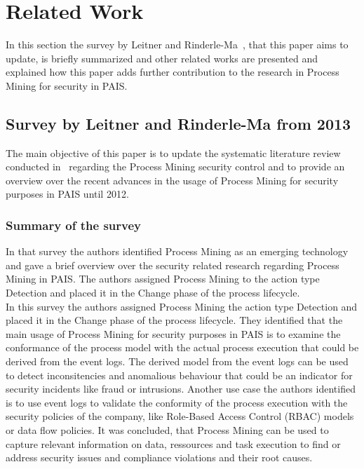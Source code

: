 \documentclass[runningheads]{llncs}
\begin{document}
\section{Related Work}\label{Related}
In this section the survey by Leitner and Rinderle-Ma~\cite{Leitner2014273}, that this paper aims to update, is briefly summarized and other related works are presented and explained how
this paper adds further contribution to the research in Process Mining for security in PAIS.\\
\subsection{Survey by Leitner and Rinderle-Ma from 2013}\label{basepaper}
The main objective of this paper is to update the systematic literature review conducted in~\cite{Leitner2014273} regarding the Process Mining security control and to provide an overview over the recent advances
in the usage of Process Mining for security purposes in PAIS until 2012. 
\subsubsection{Summary of the survey}\label{Summary}
In that survey the authors identified Process Mining as an emerging technology and gave a brief overview
over the security related research regarding Process Mining in PAIS\@. The authors assigned Process Mining to the action type Detection and placed it in the Change phase of the
process lifecycle.\\
In this survey the authors assigned Process Mining the action type Detection and placed it in the Change phase of the process lifecycle. They identified that the main usage of 
Process Mining for security purposes in PAIS is to examine the conformance of the process model with the actual process execution that could be derived from the event logs.
The derived model from the event logs can be used to detect inconsitencies and anomalious behaviour that could be an indicator for security incidents like fraud or intrusions.
Another use case the authors identified is to use event logs to validate the conformity of the process execution with the security policies of the company, like 
Role-Based Access Control (RBAC) models or data flow
policies. It was concluded, that Process Mining can be used to capture relevant information on data, ressources and task execution to find or address security issues and compliance
violations and their root causes.\\ 
\end{document}
